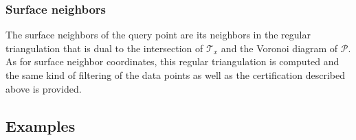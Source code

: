 \subsubsection{Surface neighbors}

The surface neighbors of the query point are its neighbors in the
regular triangulation that is dual to the intersection of
$\mathcal{T}_x$ and the Voronoi diagram of $\mathcal{P}$. As for
surface neighbor coordinates, this regular triangulation is computed
and the same kind of filtering of the data points as well as the
certification described above is provided.


\subsection{Examples}

